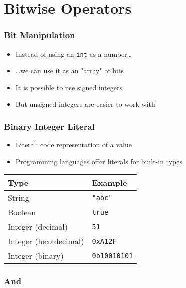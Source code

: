 \section{Bitwise Operators}
\frame{\tableofcontents[currentsection]}

\begin{frame}
  \frametitle{Bit Manipulation}
  \begin{itemize}
    \item Instead of using an \texttt{int} as a number\dots
    \item \dots we can use it as an "array" of bits
    \item It is possible to use signed integers
    \item But unsigned integers are easier to work with
  \end{itemize}
\end{frame}

\begin{frame}
  \frametitle{Binary Integer Literal}
  \begin{itemize}
    \item Literal: code representation of a value
    \item Programming languages offer literals for built-in types
  \end{itemize}
  \vskip4mm
  \begin{center}
    \begin{tabular}{ll}
      \toprule
      \textbf{Type} & \textbf{Example} \\
      \midrule
      String & \texttt{"abc"} \\
      Boolean & \texttt{true} \\
      Integer (decimal) & \texttt{51} \\
      Integer (hexadecimal) & \texttt{0xA12F} \\
      \color{red} Integer (binary) & \color{red}\texttt{0b10010101} \\
      \bottomrule
    \end{tabular}
  \end{center}
\end{frame}

\subsubsection{And}
\frame{\tableofcontents[currentsubsection]}

